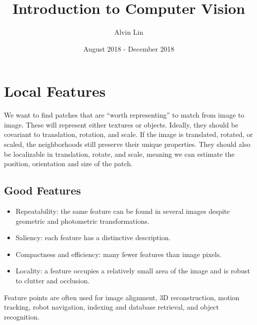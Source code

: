 \documentclass{math}
\title{Introduction to Computer Vision}
\author{Alvin Lin}
\date{August 2018 - December 2018}
\begin{document}
\maketitle

\section*{Local Features}
We want to find patches that are ``worth representing'' to match from image to
image. These will represent either textures or objects. Ideally, they should be
covariant to translation, rotation, and scale. If the image is translated,
rotated, or scaled, the neighborhoods still preserve their unique properties.
They should also be localizable in translation, rotate, and scale, meaning we
can estimate the position, orientation and size of the patch.

\subsection*{Good Features}
\begin{itemize}
  \item Repeatability: the same feature can be found in several images despite
    geometric and photometric transformations.
  \item Saliency: each feature has a distinctive description.
  \item Compactness and efficiency: many fewer features than image pixels.
  \item Locality: a feature occupies a relatively small area of the image and is
    robust to clutter and occlusion.
\end{itemize}
Feature points are often used for image alignment, 3D reconstruction, motion
tracking, robot navigation, indexing and database retrieval, and object
recognition.
\end{document}
